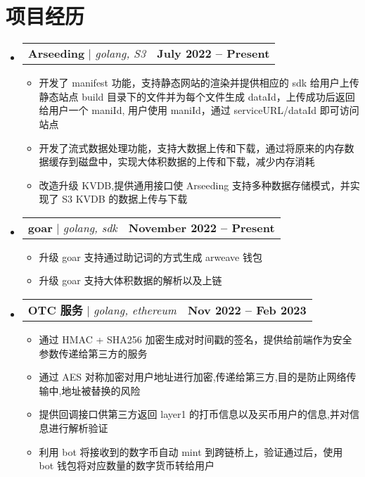 \documentclass[letterpaper,11pt]{ctexart}
\makeatletter
\newcommand{\resumeItem}[1]{
  \item\small{
    {#1 \vspace{-2pt}}
  }
}
\newcommand{\resumeProjectHeading}[2]{
    \item
    \begin{tabular*}{1.001\textwidth}{l@{\extracolsep{\fill}}r}
      \small#1 & \textbf{\small #2}\\
    \end{tabular*}\vspace{-7pt}
}
\newcommand{\resumeSubHeadingListStart}{\begin{itemize}[leftmargin=0.0in, label={}]}
\newcommand{\resumeSubHeadingListEnd}{\end{itemize}}
\newcommand{\resumeItemListStart}{\begin{itemize}}
\newcommand{\resumeItemListEnd}{\end{itemize}\vspace{-5pt}}
\makeatother
\begin{document}
\section{项目经历}
    \vspace{-5pt}
    \resumeSubHeadingListStart
      \resumeProjectHeading
          {\textbf{Arseeding} $|$ \emph{golang, S3}}{July 2022 -- Present}
          \resumeItemListStart
            \resumeItem{开发了 manifest 功能，支持静态网站的渲染并提供相应的 sdk 给用户上传静态站点 build 目录下的文件并为每个文件生成 dataId，上传成功后返回给用户一个 maniId, 用户使用 maniId，通过 serviceURL/dataId 即可访问站点}
            \resumeItem{开发了流式数据处理功能，支持大数据上传和下载，通过将原来的内存数据缓存到磁盘中，实现大体积数据的上传和下载，减少内存消耗}
            \resumeItem{改造升级 KVDB,提供通用接口使 Arseeding 支持多种数据存储模式，并实现了 S3 KVDB 的数据上传与下载}
          \resumeItemListEnd
          \vspace{-20pt}
      \resumeProjectHeading
          {\textbf{goar} $|$ \emph{golang, sdk}}{November 2022 -- Present}
          \resumeItemListStart
            \resumeItem{升级 goar 支持通过助记词的方式生成 arweave 钱包}
            \resumeItem{升级 goar 支持大体积数据的解析以及上链}
          \resumeItemListEnd
          \vspace{-20pt}
          \resumeProjectHeading
          {\textbf{OTC 服务} $|$ \emph{golang, ethereum}}{Nov 2022 -- Feb 2023}
          \resumeItemListStart
            \resumeItem{通过 HMAC + SHA256 加密生成对时间戳的签名，提供给前端作为安全参数传递给第三方的服务}
            \resumeItem{通过 AES 对称加密对用户地址进行加密,传递给第三方,目的是防止网络传输中,地址被替换的风险}
            \resumeItem{提供回调接口供第三方返回 layer1 的打币信息以及买币用户的信息,并对信息进行解析验证}
            \resumeItem{利用 bot 将接收到的数字币自动 mint 到跨链桥上，验证通过后，使用 bot 钱包将对应数量的数字货币转给用户}
          \resumeItemListEnd 
    \resumeSubHeadingListEnd
\vspace{-15pt}


%
\end{document}
